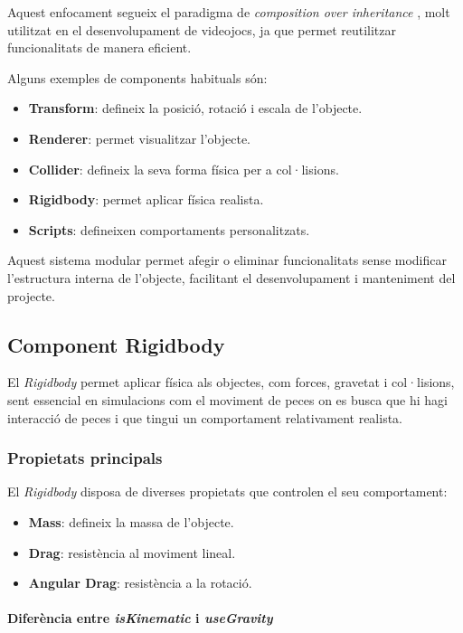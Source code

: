 \documentclass[12pt,a4paper]{report}
\begin{document}
Aquest enfocament segueix el paradigma de \textit{composition over inheritance} \cite{UnityComponents}, molt utilitzat en el desenvolupament de videojocs, ja que permet reutilitzar funcionalitats de manera eficient.

Alguns exemples de components habituals són:

\begin{itemize}
\item \textbf{Transform}: defineix la posició, rotació i escala de l'objecte.
\item \textbf{Renderer}: permet visualitzar l'objecte.
\item \textbf{Collider}: defineix la seva forma física per a col·lisions.
\item \textbf{Rigidbody}: permet aplicar física realista.
\item \textbf{Scripts}: defineixen comportaments personalitzats.
\end{itemize}

Aquest sistema modular permet afegir o eliminar funcionalitats sense modificar l'estructura interna de l'objecte, facilitant el desenvolupament i manteniment del projecte.

\subsection{Component Rigidbody}

El \textit{Rigidbody} \cite{UnityRigidbody} permet aplicar física als objectes, com forces, gravetat i col·lisions, sent essencial en simulacions com el moviment de peces on es busca que hi hagi interacció de peces i que tingui un comportament relativament realista.


\subsubsection{Propietats principals}

El \textit{Rigidbody} disposa de diverses propietats que controlen el seu comportament:

\begin{itemize}
\item \textbf{Mass}: defineix la massa de l'objecte.
\item \textbf{Drag}: resistència al moviment lineal.
\item \textbf{Angular Drag}: resistència a la rotació.
\end{itemize}


\paragraph{Diferència entre \textit{isKinematic} i \textit{useGravity}}
\end{document}
